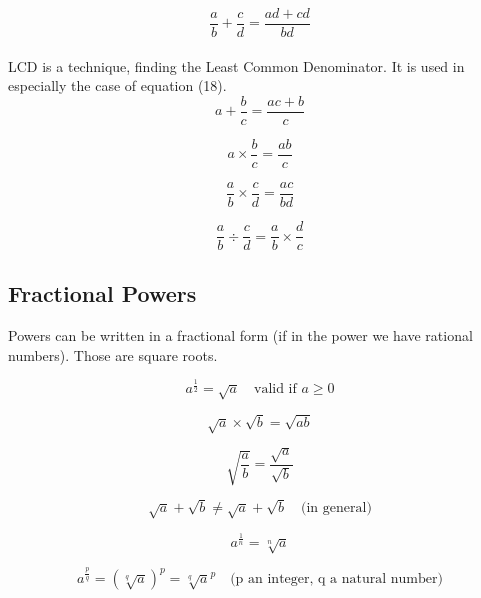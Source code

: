 \documentclass{article}
\begin{document}
\begin{equation}
 \frac{a}{b} + \frac{c}{d} = \frac{ad + cd}{bd} 
\end{equation} \\

LCD is a technique, finding the Least Common Denominator. It is used in especially the case of equation (18). \\

\begin{equation}
 a + \frac{b}{c} = \frac{ac + b}{c} 
\end{equation}

\begin{equation}
 a \times \frac{b}{c} = \frac{ab}{c} 
\end{equation}

\begin{equation}
 \frac{a}{b} \times \frac{c}{d} = \frac{ac}{bd} 
\end{equation}

\begin{equation}
 \frac{a}{b} \div \frac{c}{d} = \frac{a}{b} \times \frac{d}{c} 
\end{equation}

\subsection{Fractional Powers}
Powers can be written in a fractional form (if in the power we have rational numbers). Those are square roots. 

\begin{equation}
  a^{\frac{1}{2}} = \sqrt{a} \quad \text{valid if } a \geq 0
\end{equation}

\begin{equation}
 \sqrt{a} \times \sqrt{b} = \sqrt{ab}
\end{equation}

\begin{equation}
 \sqrt{\frac{a}{b}} = \frac{\sqrt{a}}{\sqrt{b}}
\end{equation}

\begin{equation}
 \sqrt{a} + \sqrt{b} \neq \sqrt{a} + \sqrt{b} \quad \text{(in general)}
\end{equation}

\begin{equation}
 a^{\frac{1}{n}} = \sqrt[n]{a} 
\end{equation}

\begin{equation}
 a^{\frac{p}{q}} = (\sqrt[q]{a})^p = \sqrt[q]{a}^p  \quad\text{(p an integer, q a natural number)}
\end{equation}
\end{document}
